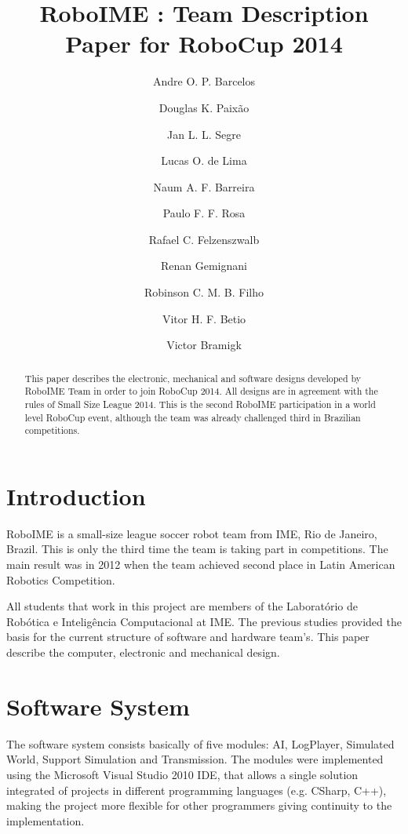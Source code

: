 \documentclass{llncs}
\begin{document}
\title{RoboIME : Team Description Paper for RoboCup 2014}
\author{
 Andre O. P. Barcelos \and
 Douglas K. Paixão \and
 Jan L. L. Segre \and
 Lucas O. de Lima \and
 Naum A. F. Barreira \and
 Paulo F. F. Rosa \and
 Rafael C. Felzenszwalb \and
 Renan Gemignani \and
 Robinson C. M. B. Filho \and
 Vitor H. F. Betio \and
 Victor Bramigk
}

\maketitle
%
\begin{abstract}
This paper describes the electronic, mechanical and software designs developed by RoboIME
Team in order to join RoboCup 2014. All designs are in agreement with the rules of Small
Size League 2014. This is the second RoboIME participation in a world level RoboCup event,
although the team was already challenged third in Brazilian competitions.
\end{abstract}

\section{Introduction}
    RoboIME is a small-size league soccer robot team from IME, Rio de Janeiro, Brazil. This
is only the third time the team is taking part in competitions. The main result was in 2012
when the team achieved second place in Latin American Robotics Competition.

All students that work in this project are members of the Laboratório de Robótica e
Inteligência Computacional at IME. The previous studies \cite{alexandre}\cite{marco} provided
the basis for the current structure of software and hardware team's. This paper describe the
computer, electronic and mechanical design.

\section{Software System}
	The software system consists basically of five modules: AI, LogPlayer, Simulated World,
Support Simulation and Transmission. The modules were implemented using the Microsoft Visual
Studio 2010 IDE, that allows a single solution integrated of projects in different programming
languages (e.g. CSharp, C++), making the project more flexible for other programmers giving
continuity to the implementation.
\end{document}
